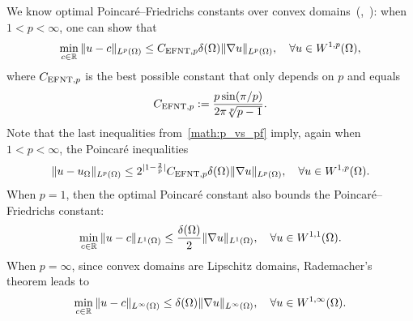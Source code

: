 \documentclass[10pt,a4paper]{article}
\begin{document}
We know optimal Poincar\'e--Friedrichs constants over convex domains~(\cite[Theorem~1.1]{ferone2012remark},~\cite[Theorem~1.1]{esposito2013poincare}): 
when $1 < p < \infty$, one can show that 
\begin{align}\label{math:esposito:pf}
    \min\limits_{ c \in {\mathbb R} }
    \| u - c \|_{L^{p}(\Omega)}
    \leq 
    C_{{\rm EFNT},p}
    {\delta}(\Omega)
    \| \nabla u \|_{L^{p}(\Omega)}
    ,
    \quad 
    \forall 
    u \in W^{1,p}(\Omega)
    ,
\end{align}
where $C_{{\rm EFNT},p}$ is the best possible constant that only depends on $p$ and equals 
\begin{align*}
    C_{{\rm EFNT},p}
    :=
    \frac{ p \sin(\pi/p) }{ 2\pi \sqrt[p]{p-1} }
    .
\end{align*}
Note that the last inequalities from~\eqref{math:p_vs_pf} imply, again when $1 < p < \infty$, the Poincar\'e inequalities
\begin{align}\label{math:esposito:poincare}
    \| u - u_{\Omega} \|_{L^{p}(\Omega)}
    \leq 
    2^{|1-\frac 2 p|}C_{{\rm EFNT},p}
    {\delta}(\Omega)
    \| \nabla u \|_{L^{p}(\Omega)}
    ,
    \quad 
    \forall 
    u \in W^{1,p}(\Omega)
    .
\end{align}
When $p=1$, then the optimal Poincar\'e constant also bounds the Poincar\'e--Friedrichs constant:
\begin{align}\label{math:l1estimate}
    \min\limits_{ c \in {\mathbb R} }
    \| u - c \|_{L^{1}(\Omega)}
    \leq 
    \frac{ {\delta}(\Omega) }{2}
    \| \nabla u \|_{L^{1}(\Omega)}
    ,
    \quad 
    \forall 
    u \in W^{1,1}(\Omega)
    .
\end{align}
When $p=\infty$, since convex domains are Lipschitz domains, Rademacher's theorem leads to 
\begin{align}\label{math:lipschitzestimate}
    \min\limits_{ c \in {\mathbb R} }
    \| u - c \|_{L^{\infty}(\Omega)}
    \leq 
    {\delta}(\Omega)
    \| \nabla u \|_{L^{\infty}(\Omega)}
    ,
    \quad 
    \forall 
    u \in W^{1,\infty}(\Omega)
    .
\end{align}


\end{document}
